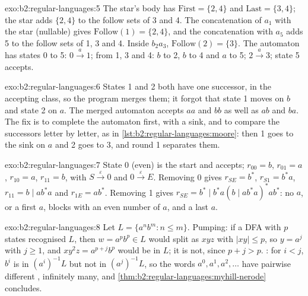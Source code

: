 \begin{solution}{exo:b2:regular-languages:5}
The star's body has $\mathrm{First} = \{2, 4\}$ and $\mathrm{Last} = \{3, 4\}$; the star adds $\{2, 4\}$ to the follow
sets of 3 and 4. The concatenation of $a_1$ with the star (nullable) gives $\mathrm{Follow}(1) = \{2, 4\}$, and the
concatenation with $a_5$ adds 5 to the follow sets of 1, 3 and 4. Inside $b_2a_3$, $\mathrm{Follow}(2) = \{3\}$. The
automaton has states 0 to 5: $0 \xrightarrow{a} 1$; from 1, 3 and 4: $b$ to 2, $b$ to 4 and $a$ to 5; $2
\xrightarrow{a} 3$; state 5 accepts.
\end{solution}

\begin{solution}{exo:b2:regular-languages:6}
States 1 and 2 both have one successor, in the accepting class, so the program merges them; it forgot that state 1
moves on $b$ and state 2 on $a$. The merged automaton accepts $aa$ and $bb$ as well as $ab$ and $ba$. The fix is to
complete the automaton first, with a sink, and to compare the successors letter by letter, as in
\cref{lst:b2:regular-languages:moore}: then 1 goes to the sink on $a$ and 2 goes to 3, and round 1 separates them.
\end{solution}

\begin{solution}{exo:b2:regular-languages:7}
State 0 (even) is the start and accepts; $r_{00} = b$, $r_{01} = a$, $r_{10} = a$, $r_{11} = b$, with $S
\xrightarrow{\varepsilon} 0$ and $0 \xrightarrow{\varepsilon} E$. Removing 0 gives $r_{SE} = b^*$, $r_{S1} = b^*a$,
$r_{11} = b \mid ab^*a$ and $r_{1E} = ab^*$. Removing 1 gives $r_{SE} = b^* \mid b^*a(b \mid ab^*a)^*ab^*$: no $a$,
or a first $a$, blocks with an even number of $a$, and a last $a$.
\end{solution}

\begin{solution}{exo:b2:regular-languages:8}
Let $L = \{a^nb^m : n \le m\}$. Pumping: if a DFA with $p$ states recognised $L$, then $w = a^pb^p \in L$ would split
as $xyz$ with $|xy| \le p$, so $y = a^j$ with $j \ge 1$, and $xy^2z = a^{p+j}b^p$ would be in $L$; it is not, since
$p + j > p$. : for $i < j$, $b^i$ is in $(a^i)^{-1}L$ but not in $(a^j)^{-1}L$, so the words $a^0, a^1,
a^2, \dots$ have pairwise different , infinitely many, and \cref{thm:b2:regular-languages:myhill-nerode}
concludes.
\end{solution}

